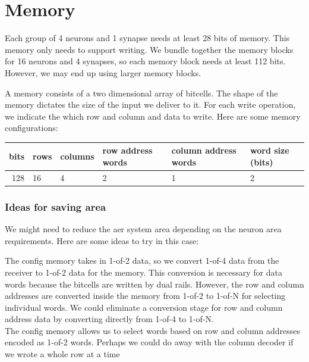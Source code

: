 \documentclass{article}
\begin{document}
\section{Memory \label{sec:memory}}

Each group of 4 neurons and 1 synapse needs at least 28 bits of memory.
This memory only needs to support writing.
We bundle together the memory blocks for 16 neurons and 4 synapses,
so each memory block needs at least 112 bits. However, we may end up using
larger memory blocks.

A memory consists of a two dimensional array of bitcells.
The shape of the memory dictates the size of the input we deliver to it.
For each write operation, we indicate the which row and column and data
to write. Here are some memory configurations:

\begin{center}
    \begin{tabular}{|r|l|l|l|l|l|}
    \hline
    bits & rows & columns & row address words & column address words & word size (bits) \\ \hline
    128 & 16 & 4 & 2 & 1 & 2 \\ \hline
    \end{tabular}
\end{center}

\subsubsection*{Ideas for saving area}

We might need to reduce the aer system area depending on the neuron area
requirements. Here are some ideas to try in this case:

\noindent
The config memory takes in 1-of-2 data, so we convert 1-of-4 data from the 
receiver to 1-of-2 data for the memory. 
This conversion is necessary for data words because the bitcells 
are written by dual rails.
However, the row and column addresses are converted inside the memory
from 1-of-2 to 1-of-N for selecting individual words. We could
eliminate a conversion stage for row and column address data by converting
directly from 1-of-4 to 1-of-N. \\

\noindent
The config memory allows us to select words based on row and column addresses
encoded as 1-of-2 words. Perhaps we could do away with the column decoder if 
we wrote a whole row at a time
\end{document}
